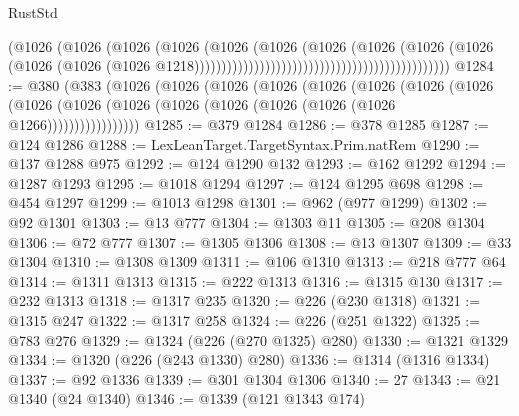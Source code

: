 \begin{lexlean}{RustStd}
\begin{coremodule}
                                                                        (@1026
                                                                          (@1026
                                                                            (@1026
                                                                              (@1026
                                                                                (@1026
                                                                                  (@1026
                                                                                    (@1026
                                                                                      (@1026
                                                                                        (@1026
                                                                                          (@1026
                                                                                            (@1026
                                                                                              (@1026
                                                                                                (@1026
                                                                                                  @1218)))))))))))))))))))))))))))))))))))))))))))))))
@1284 := @380
    (@383
      (@1026
        (@1026
          (@1026
            (@1026
              (@1026
                (@1026
                  (@1026
                    (@1026
                      (@1026 (@1026 (@1026 (@1026 (@1026 (@1026 (@1026 (@1026 @1266)))))))))))))))))
@1285 := @379 @1284
@1286 := @378 @1285
@1287 := @124 @1286
@1288 := LexLeanTarget.TargetSyntax.Prim.natRem
@1290 := @137 @1288 @975
@1292 := @124 @1290 @132
@1293 := @162 @1292
@1294 := @1287 @1293
@1295 := @1018 @1294
@1297 := @124 @1295 @698
@1298 := @454 @1297
@1299 := @1013 @1298
@1301 := @962 (@977 @1299)
@1302 := @92 @1301
@1303 := @13 @777
@1304 := @1303 @11
@1305 := @208 @1304
@1306 := @72 @777
@1307 := @1305 @1306
@1308 := @13 @1307
@1309 := @33 @1304
@1310 := @1308 @1309
@1311 := @106 @1310
@1313 := @218 @777 @64
@1314 := @1311 @1313
@1315 := @222 @1313
@1316 := @1315 @130
@1317 := @232 @1313
@1318 := @1317 @235
@1320 := @226 (@230 @1318)
@1321 := @1315 @247
@1322 := @1317 @258
@1324 := @226 (@251 @1322)
@1325 := @783 @276
@1329 := @1324 (@226 (@270 @1325) @280)
@1330 := @1321 @1329
@1334 := @1320 (@226 (@243 @1330) @280)
@1336 := @1314 (@1316 @1334)
@1337 := @92 @1336
@1339 := @301 @1304 @1306
@1340 := 27
@1343 := @21 @1340 (@24 @1340)
@1346 := @1339 (@121 @1343 @174)

\end{coremodule}
\end{lexlean}
